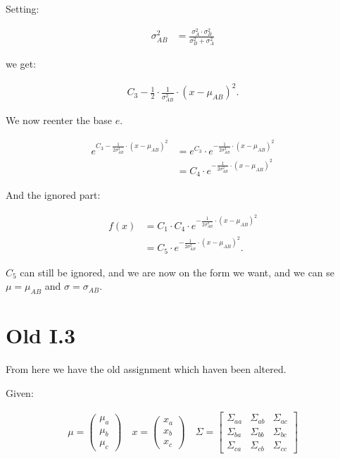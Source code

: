 Setting:

\begin{align*}
\sigma_{AB}^2 &= \frac{\sigma_A^2 \cdot \sigma_B^2}{\sigma_B^2 + \sigma_A^2}
\end{align*}

we get:

\begin{align*}
C_3 - \frac{1}{2} \cdot \frac{1}{\sigma_{AB}^2} \cdot (x - \mu_{AB})^2.
\end{align*}

We now reenter the base $e$.

\begin{align*}
e^{C_3 - \frac{1}{2\sigma_{AB}^2} \cdot (x - \mu_{AB})^2}
&=
e^{C_3} \cdot e^{- \frac{1}{2\sigma_{AB}^2} \cdot (x - \mu_{AB})^2} \\
&= C_4 \cdot e^{- \frac{1}{2\sigma_{AB}^2} \cdot (x - \mu_{AB})^2}
\end{align*}

And the ignored part:

\begin{align*}
f(x) &= C_1 \cdot C_4 \cdot e^{- \frac{1}{2\sigma_{AB}^2} \cdot (x - \mu_{AB})^2} \\
&= C_5 \cdot e^{- \frac{1}{2\sigma_{AB}^2} \cdot (x - \mu_{AB})^2}.
\end{align*}

$C_5$ can still be ignored, and we are now on the form we want, and we can se $\mu = \mu_{AB}$ and $\sigma = \sigma_{AB}$.

\section*{Old I.3}

From here we have the old assignment which haven been altered.

Given:

\begin{align*}
	\mu = \begin{pmatrix}
		\mu_a \\
		\mu_b \\
		\mu_c
	\end{pmatrix} \quad
	x = \begin{pmatrix}
		x_a \\
		x_b \\
		x_c
	\end{pmatrix} \quad
	\Sigma = \begin{bmatrix}
		\Sigma_{aa} & \Sigma_{ab} & \Sigma_{ac} \\
		\Sigma_{ba} & \Sigma_{bb} & \Sigma_{bc} \\
		\Sigma_{ca} & \Sigma_{cb} & \Sigma_{cc}
	\end{bmatrix}
\end{align*}

